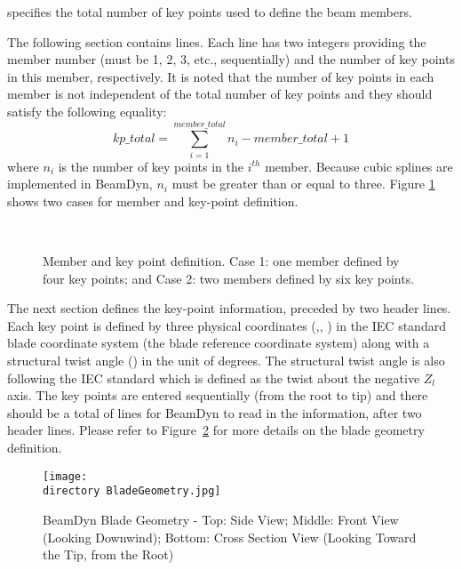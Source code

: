  specifies the total number of key points used to define the beam members.   

The following section contains  lines. 
Each line has two integers providing the member number (must be 1, 2, 3, etc., sequentially) and the number of key points in this member, respectively. 
It is noted that the number of key points in each member is not independent of the total number of key points and they should satisfy the following equality:
\begin{equation}
    \label{Keypoint}
    kp\_total = \sum_{i=1}^{member\_total} n_i - member\_total +1
\end{equation}
where $n_i$ is the number of key points in the $i^{th}$ member. 
Because cubic splines are implemented in BeamDyn, $n_i$ must be greater than or equal to three. 
Figure \ref{fig:Geometry1} shows two cases for member and key-point definition.
\begin{figure}[h!tp]
\centering
    \\
    \caption{Member and key point definition. Case 1: one member defined by four key points; and Case 2: two members defined by six key points.}
    \label{fig:Geometry1}
\end{figure}

The next section defines the key-point information, preceded by two header lines. 
Each key point is defined by three physical coordinates (,, ) in the IEC standard blade coordinate system (the blade reference coordinate system) along with a structural twist angle () in the unit of degrees. 
The structural twist angle is also following the IEC standard which is defined as the twist about the negative $Z_l$ axis. 
The key points are entered sequentially (from the root to tip) and there should be a total of  lines for BeamDyn to read in the information, after two header lines. Please refer to Figure~\ref{fig:BladeGeometry} for more details on the blade geometry definition.
\begin{figure}[h!tp]
    \centering
    \texttt{[image: \\directory BladeGeometry.jpg]}
    \caption{BeamDyn Blade Geometry - Top: Side View; Middle: Front View (Looking Downwind); Bottom: Cross Section View (Looking Toward the Tip, from the Root)
}
    \label{fig:BladeGeometry}
\end{figure}

